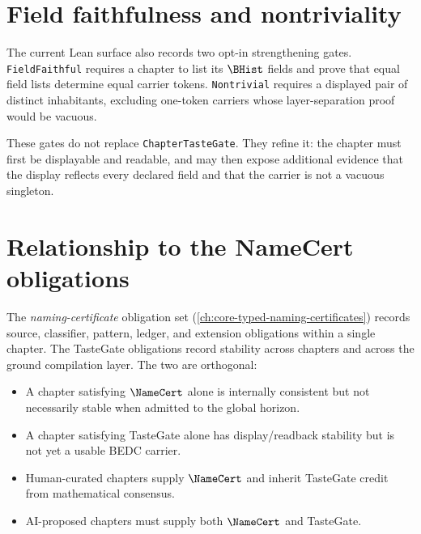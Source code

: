 
\section{Field faithfulness and nontriviality}
\label{sec:taste-gate-field-faithful-nontrivial}

The current Lean surface also records two opt-in strengthening gates.
\texttt{FieldFaithful} requires a chapter to list its $\BHist$ fields and prove
that equal field lists determine equal carrier tokens. \texttt{Nontrivial}
requires a displayed pair of distinct inhabitants, excluding one-token carriers
whose layer-separation proof would be vacuous.


These gates do not replace \texttt{ChapterTasteGate}. They refine it: the
chapter must first be displayable and readable, and may then expose additional
evidence that the display reflects every declared field and that the carrier is
not a vacuous singleton.

\section{Relationship to the NameCert obligations}
\label{sec:taste-gate-versus-namecert}

The \emph{naming-certificate} obligation set
(\autoref{ch:core-typed-naming-certificates}) records source, classifier,
pattern, ledger, and extension obligations within a single chapter. The
TasteGate obligations record stability across chapters and across the
ground compilation layer. The two are orthogonal:

\begin{itemize}
\item A chapter satisfying $\NameCert$ alone is internally consistent
      but not necessarily stable when admitted to the global horizon.
\item A chapter satisfying TasteGate alone has display/readback stability
      but is not yet a usable BEDC carrier.
\item Human-curated chapters supply $\NameCert$ and inherit TasteGate
      credit from mathematical consensus.
\item AI-proposed chapters must supply both $\NameCert$ and TasteGate.
\end{itemize}


